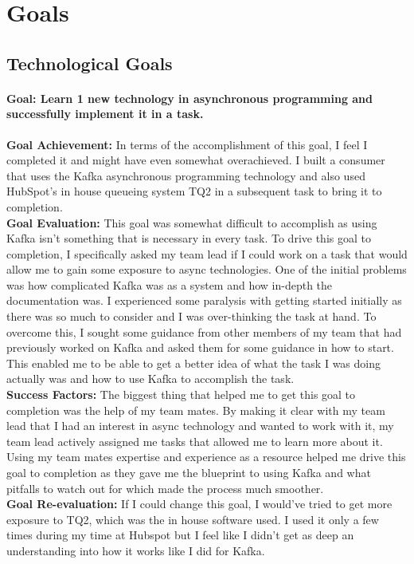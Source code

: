 \chapter{Goals}

\section{Technological Goals}
\subsubsection*{Goal: Learn 1 new technology in asynchronous programming and successfully implement it in a task.}
\textbf{Goal Achievement: }  In terms of the accomplishment of this goal,  I feel I completed it and might have even somewhat overachieved.  I built a consumer that uses the Kafka asynchronous programming technology and also used HubSpot's in house queueing system TQ2 in a subsequent task to bring it to completion.\\
\textbf{Goal Evaluation: } This goal was somewhat difficult to accomplish as using Kafka isn't something that is necessary in every task.  To drive this goal to completion,  I specifically asked my team lead if I could work on a task that would allow me to gain some exposure to async technologies.  One of the initial problems was how complicated Kafka was as a system and how in-depth the documentation was.  I experienced some paralysis with getting started initially as there was so much to consider and I was over-thinking the task at hand.  To overcome this,  I sought some guidance from other members of my team that had previously worked on Kafka and asked them for some guidance in how to start.  This enabled me to be able to get a better idea of what the task I was doing actually was and how to use Kafka to accomplish the task. \\  
\textbf{Success Factors:}  The biggest thing that helped me to get this goal to completion was the help of my team mates. By making it clear with my team lead that I had an interest in async technology and wanted to work with it,  my team lead actively assigned me tasks that allowed me to learn more about it.  Using my team mates expertise and experience as a resource helped me drive this goal to completion as they gave me the blueprint to using Kafka and what pitfalls to watch out for which made the process much smoother. \\
\textbf{Goal Re-evaluation:} If I could change this goal,  I would've tried to get more exposure to TQ2,  which was the in house software used.  I used it only a few times during my time at Hubspot but I feel like I didn't get as deep an understanding into how it works like I did for Kafka. 


